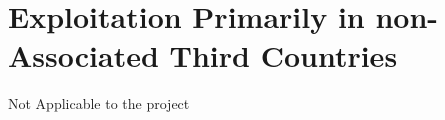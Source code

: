 
%

\section{Exploitation Primarily in non-Associated Third Countries}
Not Applicable to the project
